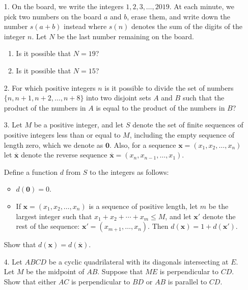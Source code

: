 \documentclass{article}
\begin{document}
\begin{enumerate}

\bigskip
\item[1.] %
On the board, we write the integers $1, 2, 3, \dots, 2019$.
At each minute, we pick two numbers on the board $a$ and $b$, erase them, and write down the number $s(a + b)$ instead where $s(n)$ denotes the sum of the digits of the integer $n$.
Let $N$ be the last number remaining on the board.
\begin{enumerate}
	\item Is it possible that $N = 19$?
	\item Is it possible that $N = 15$?
\end{enumerate}


\medskip
\item[2.] %
For which positive integers $n$ is it possible to divide the set of numbers $\{n, n+1, n+2, \dotsc, n+8\}$ into two disjoint sets $A$ and $B$ such that the product of the numbers in $A$ is equal to the product of the numbers in $B$?


\medskip
\item[3.] %
Let $M$ be a positive integer, and let $S$ denote the set of finite sequences of positive integers less than or equal to $M$, including the empty sequence of length zero, which we denote as $\mathbf{0}$.
Also, for a sequence $\mathbf{x} = (x_1, x_2, \dotsc, x_n)$ let $\overline{\mathbf{x}}$ denote the reverse sequence $\overline{\mathbf{x}} = (x_n, x_{n-1}, \dotsc, x_1)$.

Define a function $d$ from $S$ to the integers as follows:
\begin{itemize}
\item $d(\mathbf{0}) = 0$.
\item If $\mathbf{x} = (x_1, x_2, \dotsc, x_n)$ is a sequence of positive length, let $m$ be the largest integer such that $x_1 +x_2 +\dotsb +x_m \leq M$, and let $\mathbf{x}'$ denote the rest of the sequence: $\mathbf{x}' = (x_{m+1}, \dotsc, x_n)$.
Then $d(\mathbf{x}) = 1 +d(\mathbf{x}')$.
\end{itemize}
Show that $d(\mathbf{x}) = d(\overline{\mathbf{x}})$.


\medskip
\item[4.]
Let $ABCD$ be a cyclic quadrilateral with its diagonals intersecting at $E$.
Let $M$ be the midpoint of $AB$.
Suppose that $ME$ is perpendicular to $CD$.
Show that either $AC$ is perpendicular to $BD$ or $AB$ is parallel to $CD$.



\end{enumerate}
\end{document}
